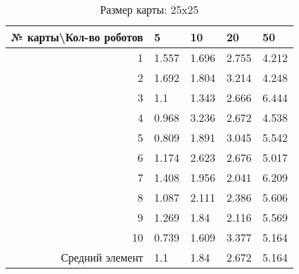 \begin{table}[H]
\centering
\begin{tabular}{|r|l|l|l|l|}
\hline
№ карты\textbackslash Кол-во роботов & \textbf{5} & \textbf{10} & \textbf{20} & \textbf{50}\\ \hline
1 & 1.557 & 1.696 & 2.755 & 4.212\\ \hline
2 & 1.692 & 1.804 & 3.214 & 4.248\\ \hline
3 & 1.1 & 1.343 & 2.666 & 6.444\\ \hline
4 & 0.968 & 3.236 & 2.672 & 4.538\\ \hline
5 & 0.809 & 1.891 & 3.045 & 5.542\\ \hline
6 & 1.174 & 2.623 & 2.676 & 5.017\\ \hline
7 & 1.408 & 1.956 & 2.041 & 6.209\\ \hline
8 & 1.087 & 2.111 & 2.386 & 5.606\\ \hline
9 & 1.269 & 1.84 & 2.116 & 5.569\\ \hline
10 & 0.739 & 1.609 & 3.377 & 5.164\\ \hline
Средний элемент & 1.1 & 1.84 & 2.672 & 5.164\\ \hline
\end{tabular}
\caption*{Размер карты: 25x25}
\end{table}
